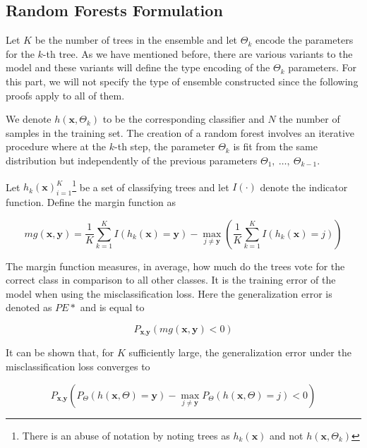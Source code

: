 \subsection{ Random Forests Formulation}\label{subsection:random_forests_formulation}

Let $K$ be the number of trees in the ensemble and let $\Theta_k$ encode the parameters for the $k$-th tree.
As we have mentioned before, there are various variants to the model and these variants will define the type encoding of the $\Theta_k$ parameters.
For this part, we will not specify the type of ensemble constructed since the following proofs apply to all of them.

We denote $h(\textbf{x},\Theta_k)$ to be the corresponding classifier and $N$ the number of samples in the training set.
The creation of a random forest involves an iterative procedure where at the $k$-th step, the parameter $\Theta_k$ is fit from the same distribution but independently of the previous parameters $\Theta_1, \ \ldots, \ \Theta_{k-1}$. %


Let ${h_k(\textbf{x}) }_{i=1}^K$\footnote{There is an abuse of notation by noting trees as $h_k(\textbf{x})$ and not $h(\textbf{x}, \Theta_k)$ } be a set of classifying trees and let $I(\cdot)$ denote the indicator function.
Define the margin function as

\begin{equation}
mg(\textbf{x},\textbf{y}) = \frac{1}{K}  \sum_{k=1}^K I(h_k(\textbf{x}) = \textbf{y})
- \max_{j\neq \textbf{y}}\left(\frac{1}{K} \sum_{k=1}^K I(h_k(\textbf{x}) = j) \right)
\end{equation}\label{eq:rf-marginFun}


The margin function measures, in average, how much do the trees vote for the correct class in comparison to all other classes.
It is the training error of the model when using the misclassification loss. Here the generalization error is denoted as $PE*$ and is equal to

\begin{equation}
P_{\textbf{x}, \textbf{y} }(mg(\textbf{x},\textbf{y}) <0)
\end{equation}

 It can be shown that, for $K$ sufficiently large, the generalization error under the misclassification loss converges to

\begin{equation}
 P_{\textbf{x}, \textbf{y} } ( P_{\Theta} (h(\textbf{x}, \Theta) = \textbf{y}) - \max_{j \neq \textbf{y}} P_{\Theta} (h(\textbf{x}, \Theta) = j) < 0)
 \end{equation}

